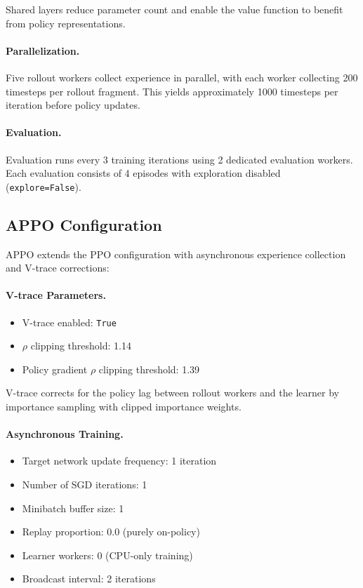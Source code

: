 \documentclass[english,bachelor]{hsluthesis}
\begin{document}
Shared layers reduce parameter count and enable the value function to benefit from policy representations.

\paragraph{Parallelization.}
Five rollout workers collect experience in parallel, with each worker collecting 200 timesteps per rollout fragment. This yields approximately 1000 timesteps per iteration before policy updates.

\paragraph{Evaluation.}
Evaluation runs every 3 training iterations using 2 dedicated evaluation workers. Each evaluation consists of 4 episodes with exploration disabled (\texttt{explore=False}).

\subsection{APPO Configuration}

APPO extends the PPO configuration with asynchronous experience collection and V-trace corrections:

\paragraph{V-trace Parameters.}
\begin{itemize}
    \item V-trace enabled: \texttt{True}
    \item $\rho$ clipping threshold: 1.14
    \item Policy gradient $\rho$ clipping threshold: 1.39
\end{itemize}

V-trace corrects for the policy lag between rollout workers and the learner by importance sampling with clipped importance weights.

\paragraph{Asynchronous Training.}
\begin{itemize}
    \item Target network update frequency: 1 iteration
    \item Number of SGD iterations: 1
    \item Minibatch buffer size: 1
    \item Replay proportion: 0.0 (purely on-policy)
    \item Learner workers: 0 (CPU-only training)
    \item Broadcast interval: 2 iterations
\end{itemize}
\end{document}
